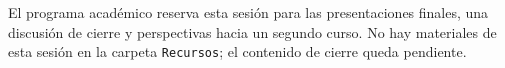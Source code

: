 \begin{nota}
El programa académico reserva esta sesión para las presentaciones finales, una discusión de cierre y perspectivas hacia un segundo curso. No hay materiales de esta sesión en la carpeta \texttt{Recursos}; el contenido de cierre queda pendiente.
\end{nota}
